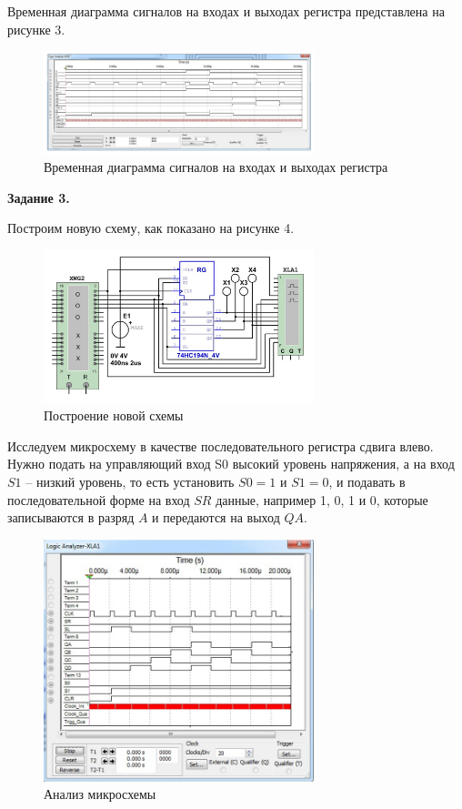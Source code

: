 \documentclass[spec, och, labwork]{shiza}
\begin{document}
  Временная диаграмма сигналов на входах и выходах регистра представлена на рисунке 3.

  \begin{figure}[H]
    \centering     
    \includegraphics[width=0.7\textwidth]{photo/3}
    \caption{Временная диаграмма сигналов на входах и выходах регистра}
  \end{figure}

  \textbf{Задание 3.}

  Построим новую схему, как показано на рисунке 4.

  \begin{figure}[H]
    \centering     
    \includegraphics[width=0.7\textwidth]{photo/4}
    \caption{Построение новой схемы}
  \end{figure}

  Исследуем микросхему в качестве последовательного регистра сдвига влево. Нужно подать на управляющий вход S0 высокий уровень напряжения, а на вход $S1$ – низкий уровень, то есть установить $S0 = 1$ и $S1 = 0$, и подавать в последовательной форме на вход $SR$ данные, например 1, 0, 1 и 0, которые записываются в разряд $A$ и передаются на выход $QA$.

  \begin{figure}[H]
    \centering     
    \includegraphics[width=0.7\textwidth]{photo/5}
    \caption{Анализ микросхемы}
  \end{figure}
\end{document}
